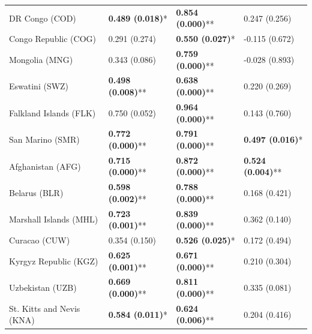 \begin{longtable}{p{5cm}p{3cm}p{3cm}p{5cm}}
DR Congo (COD) & \textcolor{atlLime600}{\textbf{0.489 (0.018)}*} & \textcolor{atlLime600}{\textbf{0.854 (0.000)}**} & \textcolor{atlOrange600}{0.247 (0.256)} \\
Congo Republic (COG) & \textcolor{atlOrange600}{0.291 (0.274)} & \textcolor{atlLime600}{\textbf{0.550 (0.027)}*} & \textcolor{atlOrange600}{-0.115 (0.672)} \\
Mongolia (MNG) & \textcolor{atlOrange600}{0.343 (0.086)} & \textcolor{atlLime600}{\textbf{0.759 (0.000)}**} & \textcolor{atlOrange600}{-0.028 (0.893)} \\
Eswatini (SWZ) & \textcolor{atlLime600}{\textbf{0.498 (0.008)}**} & \textcolor{atlLime600}{\textbf{0.638 (0.000)}**} & \textcolor{atlOrange600}{0.220 (0.269)} \\
Falkland Islands (FLK) & \textcolor{atlOrange600}{0.750 (0.052)} & \textcolor{atlLime600}{\textbf{0.964 (0.000)}**} & \textcolor{atlOrange600}{0.143 (0.760)} \\
San Marino (SMR) & \textcolor{atlLime600}{\textbf{0.772 (0.000)}**} & \textcolor{atlLime600}{\textbf{0.791 (0.000)}**} & \textcolor{atlLime600}{\textbf{0.497 (0.016)}*} \\
Afghanistan (AFG) & \textcolor{atlLime600}{\textbf{0.715 (0.000)}**} & \textcolor{atlLime600}{\textbf{0.872 (0.000)}**} & \textcolor{atlLime600}{\textbf{0.524 (0.004)}**} \\
Belarus (BLR) & \textcolor{atlLime600}{\textbf{0.598 (0.002)}**} & \textcolor{atlLime600}{\textbf{0.788 (0.000)}**} & \textcolor{atlOrange600}{0.168 (0.421)} \\
Marshall Islands (MHL) & \textcolor{atlLime600}{\textbf{0.723 (0.001)}**} & \textcolor{atlLime600}{\textbf{0.839 (0.000)}**} & \textcolor{atlOrange600}{0.362 (0.140)} \\
Curacao (CUW) & \textcolor{atlOrange600}{0.354 (0.150)} & \textcolor{atlLime600}{\textbf{0.526 (0.025)}*} & \textcolor{atlOrange600}{0.172 (0.494)} \\
Kyrgyz Republic (KGZ) & \textcolor{atlLime600}{\textbf{0.625 (0.001)}**} & \textcolor{atlLime600}{\textbf{0.671 (0.000)}**} & \textcolor{atlOrange600}{0.210 (0.304)} \\
Uzbekistan (UZB) & \textcolor{atlLime600}{\textbf{0.669 (0.000)}**} & \textcolor{atlLime600}{\textbf{0.811 (0.000)}**} & \textcolor{atlOrange600}{0.335 (0.081)} \\
St. Kitts and Nevis (KNA) & \textcolor{atlLime600}{\textbf{0.584 (0.011)}*} & \textcolor{atlLime600}{\textbf{0.624 (0.006)}**} & \textcolor{atlOrange600}{0.204 (0.416)} \\

\end{longtable}
